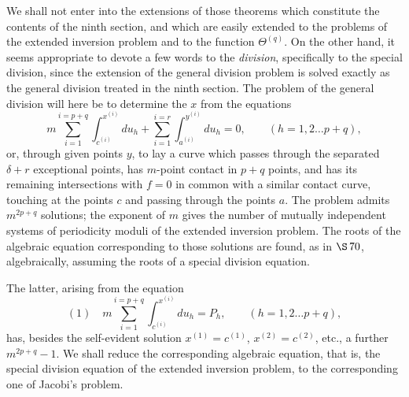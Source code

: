 \documentclass[10pt]{article}
\begin{document}
We shall not enter into the extensions of those theorems which constitute the contents of the ninth section, and which are easily extended to the problems of the extended inversion problem and to the function \(\Theta^{(q)}\). On the other hand, it seems appropriate to devote a few words to the \emph{division}, specifically to the special division, since the extension of the general division problem is solved exactly as the general division treated in the ninth section. The problem of the general division will here be to determine the \(x\) from the equations
\[
m\sum_{i=1}^{i=p+q}\int_{c^{(i)}}^{x^{(i)}}du_h
+\sum_{i=1}^{i=r}\int_{a^{(i)}}^{y^{(i)}}du_h=0,
\qquad (h=1,2\ldots p+q),
\]
or, through given points \(y\), to lay a curve which passes through the separated \(\delta+r\) exceptional points, has \(m\)-point contact in \(p+q\) points, and has its remaining intersections with \(f=0\) in common with a similar contact curve, touching at the points \(c\) and passing through the points \(a\). The problem admits \(m^{2p+q}\) solutions; the exponent of \(m\) gives the number of mutually independent systems of periodicity moduli of the extended inversion problem. The roots of the algebraic equation corresponding to those solutions are found, as in \(\S\,70\), algebraically, assuming the roots of a special division equation.

The latter, arising from the equation
\[
(1)\quad m\sum_{i=1}^{i=p+q}\int_{c^{(i)}}^{x^{(i)}}du_h=P_h,
\qquad (h=1,2\ldots p+q),
\]
has, besides the self-evident solution \(x^{(1)}=c^{(1)}\), \(x^{(2)}=c^{(2)}\), etc., a further \(m^{2p+q}-1\). We shall reduce the corresponding algebraic equation, that is, the special division equation of the extended inversion problem, to the corresponding one of Jacobi's problem.
\end{document}
